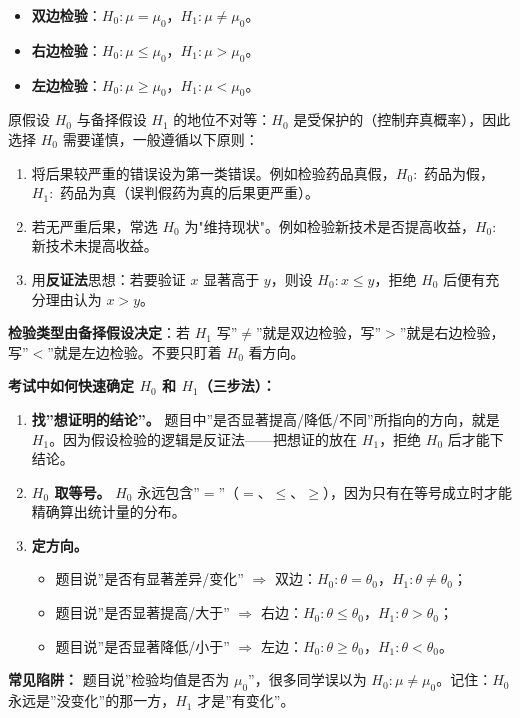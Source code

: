 ﻿\documentclass[lang=cn,11pt]{elegantbook}
\begin{document}
\begin{definition}[双边检验与单边检验]\label{def:ht-types}
\begin{itemize}
    \item \textbf{双边检验}：\(H_0\colon \mu = \mu_0\)，\(H_1\colon \mu \neq \mu_0\)。
    \item \textbf{右边检验}：\(H_0\colon \mu \leq \mu_0\)，\(H_1\colon \mu > \mu_0\)。
    \item \textbf{左边检验}：\(H_0\colon \mu \geq \mu_0\)，\(H_1\colon \mu < \mu_0\)。
\end{itemize}
\end{definition}

\begin{note}
原假设 \(H_0\) 与备择假设 \(H_1\) 的地位不对等：\(H_0\) 是受保护的（控制弃真概率），因此选择 \(H_0\) 需要谨慎，一般遵循以下原则：
\begin{enumerate}
    \item 将后果较严重的错误设为第一类错误。例如检验药品真假，\(H_0\colon\) 药品为假，\(H_1\colon\) 药品为真（误判假药为真的后果更严重）。
    \item 若无严重后果，常选 \(H_0\) 为"维持现状"。例如检验新技术是否提高收益，\(H_0\colon\) 新技术未提高收益。
    \item 用\textbf{反证法}思想：若要验证 \(x\) 显著高于 \(y\)，则设 \(H_0\colon x \leq y\)，拒绝 \(H_0\) 后便有充分理由认为 \(x > y\)。
\end{enumerate}
\textbf{检验类型由备择假设决定}：若 \(H_1\) 写”\(\neq\)”就是双边检验，写”\(>\)”就是右边检验，写”\(<\)”就是左边检验。不要只盯着 \(H_0\) 看方向。
\end{note}

\begin{note}
\textbf{考试中如何快速确定 $H_0$ 和 $H_1$（三步法）：}
\begin{enumerate}
    \item \textbf{找”想证明的结论”。} 题目中”是否显著提高/降低/不同”所指向的方向，就是 $H_1$。因为假设检验的逻辑是反证法——把想证的放在 $H_1$，拒绝 $H_0$ 后才能下结论。
    \item \textbf{$H_0$ 取等号。} $H_0$ 永远包含”$=$”（$=$、$\le$、$\ge$），因为只有在等号成立时才能精确算出统计量的分布。
    \item \textbf{定方向。}
    \begin{itemize}
        \item 题目说”是否有显著差异/变化” $\Longrightarrow$ 双边：$H_0\colon\theta=\theta_0$，$H_1\colon\theta\neq\theta_0$；
        \item 题目说”是否显著提高/大于” $\Longrightarrow$ 右边：$H_0\colon\theta\le\theta_0$，$H_1\colon\theta>\theta_0$；
        \item 题目说”是否显著降低/小于” $\Longrightarrow$ 左边：$H_0\colon\theta\ge\theta_0$，$H_1\colon\theta<\theta_0$。
    \end{itemize}
\end{enumerate}
\textbf{常见陷阱：} 题目说”检验均值是否为 $\mu_0$”，很多同学误以为 $H_0\colon\mu\neq\mu_0$。记住：$H_0$ 永远是”没变化”的那一方，$H_1$ 才是”有变化”。
\end{note}
\end{document}
